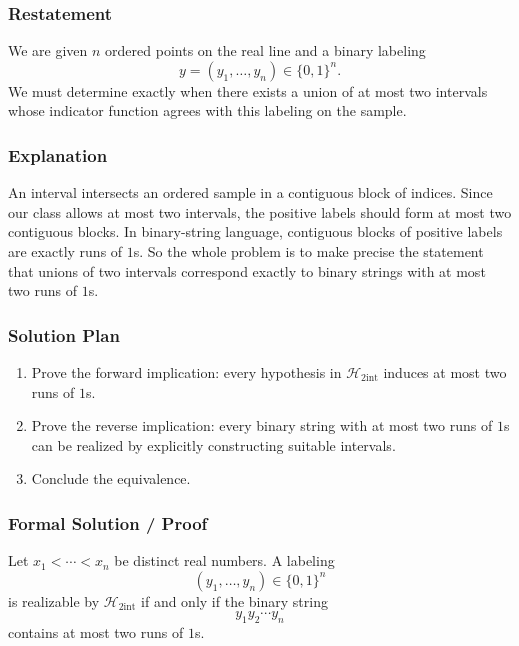 \documentclass{article}
\newcommand{\classA}{\mathcal{H}_{2\mathrm{int}}}
\newcommand{\zeroone}{\{0,1\}}
\begin{document}
\begin{solutionbox}

\subsubsection{Restatement}

We are given \(n\) ordered points on the real line and a binary labeling
\[
y=(y_1,\dots,y_n)\in\zeroone^n.
\]
We must determine exactly when there exists a union of at most two intervals
whose indicator function agrees with this labeling on the sample.

\subsubsection{Explanation}

An interval intersects an ordered sample in a contiguous block of indices. Since
our class allows at most two intervals, the positive labels should form at most
two contiguous blocks. In binary-string language, contiguous blocks of positive
labels are exactly runs of \(1\)s. So the whole problem is to make precise the
statement that unions of two intervals correspond exactly to binary strings with
at most two runs of \(1\)s.

\subsubsection{Solution Plan}

\begin{enumerate}[leftmargin=2.5em]
    \item Prove the forward implication:
    every hypothesis in \(\classA\) induces at most two runs of \(1\)s.
    \item Prove the reverse implication:
    every binary string with at most two runs of \(1\)s can be realized by
    explicitly constructing suitable intervals.
    \item Conclude the equivalence.
\end{enumerate}

\subsubsection{Formal Solution / Proof}

\begin{theorem}
Let \(x_1 < \cdots < x_n\) be distinct real numbers. A labeling
\[
(y_1,\dots,y_n)\in\zeroone^n
\]
is realizable by \(\classA\) if and only if the binary string
\[
y_1y_2\cdots y_n
\]
contains at most two runs of \(1\)s.
\end{theorem}


\end{solutionbox}
\end{document}
